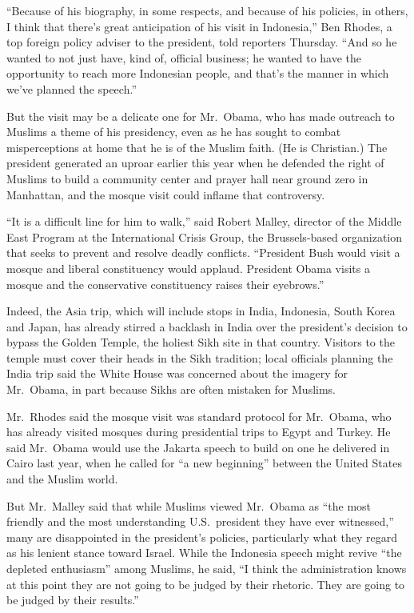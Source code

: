 ﻿\documentclass[12pt]{article}
\begin{document}
``Because of his biography, in some respects, and because of his policies, in others, I think that
there's great anticipation of his visit in Indonesia,'' Ben Rhodes, a top foreign policy adviser to
the president, told reporters Thursday. ``And so he wanted to not just have, kind of, official
business; he wanted to have the opportunity to reach more Indonesian people, and that's the manner
in which we've planned the speech.''

But the visit may be a delicate one for Mr.~Obama, who has made outreach to Muslims a theme of his
presidency, even as he has sought to combat misperceptions at home that he is of the Muslim faith.
(He is Christian.) The president generated an uproar earlier this year when he defended the right of
Muslims to build a community center and prayer hall near ground zero in Manhattan, and the mosque
visit could inflame that controversy.

``It is a difficult line for him to walk,'' said Robert Malley, director of the Middle East Program
at the International Crisis Group, the Brussels-based organization that seeks to prevent and resolve
deadly conflicts. ``President Bush would visit a mosque and liberal constituency would applaud.
President Obama visits a mosque and the conservative constituency raises their eyebrows.''

Indeed, the Asia trip, which will include stops in India, Indonesia, South Korea and Japan, has
already stirred a backlash in India over the president's decision to bypass the Golden Temple, the
holiest Sikh site in that country. Visitors to the temple must cover their heads in the Sikh
tradition; local officials planning the India trip said the White House was concerned about the
imagery for Mr.~Obama, in part because Sikhs are often mistaken for Muslims.

Mr.~Rhodes said the mosque visit was standard protocol for Mr.~Obama, who has already visited
mosques during presidential trips to Egypt and Turkey. He said Mr.~Obama would use the Jakarta
speech to build on one he delivered in Cairo last year, when he called for ``a new beginning''
between the United States and the Muslim world.

But Mr.~Malley said that while Muslims viewed Mr.~Obama as ``the most friendly and the most
understanding U.S.~president they have ever witnessed,'' many are disappointed in the president's
policies, particularly what they regard as his lenient stance toward Israel. While the Indonesia
speech might revive ``the depleted enthusiasm'' among Muslims, he said, ``I think the administration
knows at this point they are not going to be judged by their rhetoric. They are going to be judged
by their results.''
\end{document}
